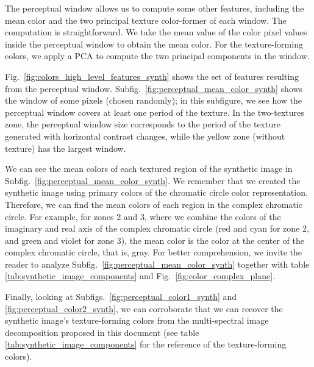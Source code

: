 The perceptual window allows us to compute some other features, including the mean color and the two principal texture color-former of each window. The computation is straightforward. We take the mean value of the color pixel values inside the perceptual window to obtain the mean color. For the texture-forming colors, we apply a PCA to compute the two principal components in the window.

Fig.\ \ref{fig:colors_high_level_features_synth} shows the set of features resulting from the perceptual window. Subfig.\ \ref{fig:perceptual_mean_color_synth} shows the window of some pixels (chosen randomly); in this subfigure, we see how the perceptual window covers at least one period of the texture. In the two-textures zone, the perceptual window size corresponds to the period of the texture generated with horizontal contrast changes, while the yellow zone (without texture) has the largest window. 

We can see the mean colors of each textured region of the synthetic image in Subfig.\ \ref{fig:perceptual_mean_color_synth}. We remember that we created the synthetic image using primary colors of the chromatic circle color representation. Therefore, we can find the mean colors of each region in the complex chromatic circle. For example, for zones 2 and 3, where we combine the colors of the imaginary and real axis of the complex chromatic circle (red and cyan for zone 2, and green and violet for zone 3), the mean color is the color at the center of the complex chromatic circle, that is, gray. For better comprehension, we invite the reader to analyze Subfig.\ \ref{fig:perceptual_mean_color_synth} together with table \ref{tab:synthetic_image_components} and Fig.\ \ref{fig:color_complex_plane}.

Finally, looking at Subfigs.\ \ref{fig:perceptual_color1_synth} and \ref{fig:perceptual_color2_synth}, we can corroborate that we can recover the synthetic image's texture-forming colors from the multi-spectral image decomposition proposed in this document (see table \ref{tab:synthetic_image_components} for the reference of the texture-forming colors).

